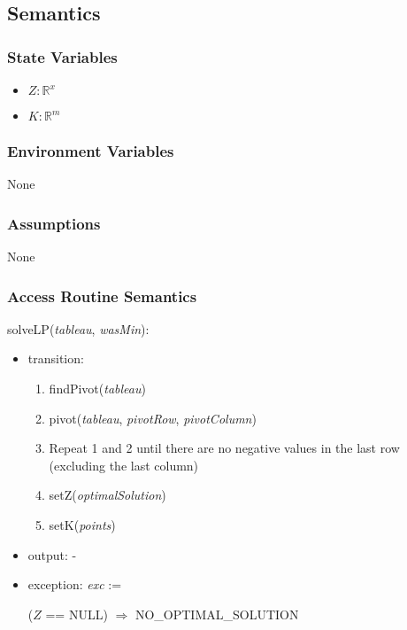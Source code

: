 \documentclass[12pt, titlepage]{article}
\begin{document}
\subsection{Semantics}

\subsubsection{State Variables}

\begin{itemize}
	\item $Z:\mathbb{R}^x$
	\item $K:\mathbb{R}^m$
\end{itemize}

\subsubsection{Environment Variables}

None

\subsubsection{Assumptions}

None

\subsubsection{Access Routine Semantics}

\noindent 
solveLP(\textit{tableau}, \textit{wasMin}):
\begin{itemize}
	\item transition: 
		\begin{enumerate}
			\item findPivot(\textit{tableau})
			\item pivot(\textit{tableau}, \textit{pivotRow}, 
			\textit{pivotColumn})
			\item Repeat 1 and 2 until there are no negative values in the last 
			row (excluding the last column)
			\item setZ(\textit{optimalSolution})
			\item setK(\textit{points})
		\end{enumerate}

	\item output: -
	\item exception: \textit{exc} := 
	
	($Z$ == NULL) \hspace{3.7cm} $\Rightarrow$ NO\_OPTIMAL\_SOLUTION
\end{itemize}
\end{document}

